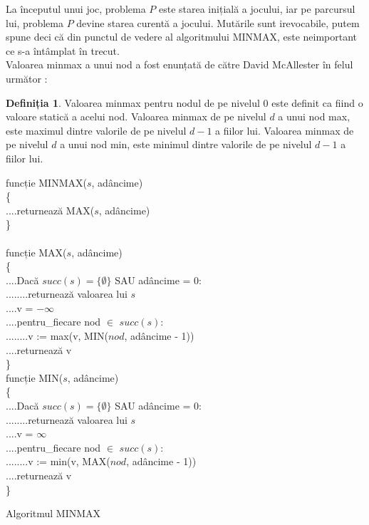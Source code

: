 \documentclass[12pt,twoside,a4paper,fleqn]{book}
\theoremstyle{definition}
\newtheorem{definitie}{Definiția}
\begin{document}
La începutul unui joc, problema $P$ este starea inițială a jocului, iar pe parcursul lui, problema $P$ devine starea curentă a jocului. Mutările sunt irevocabile, putem spune deci că din punctul de vedere al algoritmului MINMAX, este neimportant ce s-a întâmplat în trecut.\\
Valoarea minmax a unui nod a fost enunțată de către David McAllester în felul următor \cite{mcallester}:
\begin{definitie}
Valoarea minmax pentru nodul de pe nivelul $0$ este definit ca fiind o valoare statică a acelui nod. Valoarea minmax de pe nivelul $d$ a unui nod max, este maximul dintre valorile de pe nivelul $d-1$ a fiilor lui. Valoarea minmax de pe nivelul $d$ a unui nod min, este minimul dintre valorile de pe nivelul $d-1$ a fiilor lui.
\end{definitie}

\begin{pseudocod}
funcție MINMAX($s$, adâncime)\\
\{\\
....returnează MAX($s$, adâncime)\\
\}\\
\\
funcție MAX($s$, adâncime)\\
\{\\
....Dacă $succ(s) = \{\emptyset\}$ SAU adâncime = $0$:\\
........returnează valoarea lui $s$\\

....v = $-\infty$\\
....pentru\_fiecare nod $\in$ $succ(s)$:\\
........v := max(v, MIN($nod$, adâncime - 1))\\
....returnează v\\
\}\\

funcție MIN($s$, adâncime)\\
\{\\
....Dacă $succ(s) = \{\emptyset\}$ SAU adâncime = $0$:\\
........returnează valoarea lui $s$\\

....v = $\infty$\\
....pentru\_fiecare nod $\in$ $succ(s)$:\\
........v := min(v, MAX($nod$, adâncime - 1))\\
....returnează v\\
\}


\caption{Algoritmul MINMAX}
\end{pseudocod}
\end{document}

